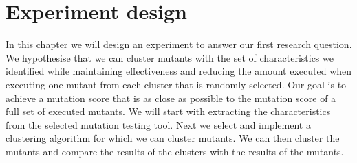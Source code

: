 \documentclass[../../main]{subfiles}
\begin{document}
\clearpage
\section{Experiment design}
In this chapter we will design an experiment to answer our first research question.
We hypothesise that we can cluster mutants with the set of characteristics we identified
while maintaining effectiveness and reducing the amount executed when executing one mutant from each cluster that is randomly selected.
Our goal is to achieve a mutation score that is as close as possible to the mutation score of a full set of executed mutants.
\newline
We will start with extracting the characteristics from the selected mutation testing tool. 
Next we select and implement a clustering algorithm for which we can cluster mutants.
We can then cluster the mutants and compare the results of the clusters with the results of the mutants. 
\end{document}
